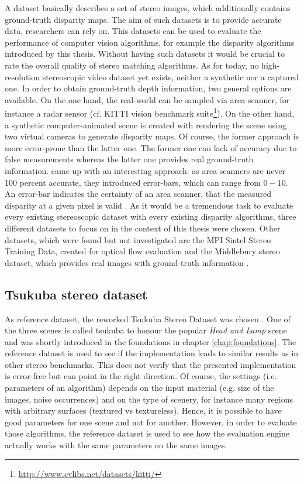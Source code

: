 A dataset basically describes a set of stereo images, which additionally contains ground-truth disparity maps.
The aim of such datasets is to provide accurate data, researchers can rely on.
This datasets can be used to evaluate the performance of computer vision algorithms, for example the disparity algorithms introduced by this thesis.
Without having such datasets it would be crucial to rate the overall quality of stereo matching algorithms.
As for today, no high-resolution stereoscopic video dataset yet exists, neither a synthetic nor a captured one.
In order to obtain ground-truth depth information, two general options are available.
On the one hand, the real-world can be sampled via area scanner, for instance a radar sensor (cf. KITTI vision benchmark suite\footnote{\url{http://www.cvlibs.net/datasets/kitti/}}).
On the other hand, a synthetic computer-animated scene is created with rendering the scene using two virtual cameras to generate disparity maps.
Of course, the former approach is more error-prone than the latter one.
The former one can lack of accuracy due to false measurements whereas the latter one provides real ground-truth information.
\newline\newline\noindent \citeauthor{kondermann2015stereo} came up with an interesting approach:
as area scanners are never 100 percent accurate, they introduced error-bars, which can range from $0-10$.
An error-bar indicates the certainty of an area scanner, that the measured disparity at a given pixel is valid \citep{kondermann2015stereo}.
As it would be a tremendous task to evaluate every existing stereoscopic dataset with every existing disparity algorithms, three different datasets to focus on in the context of this thesis were chosen.
Other datasets, which were found but not investigated are the MPI Sintel Stereo Training Data, created for optical flow evaluation \citep{Butler:ECCV:2012} and the Middlebury stereo dataset, which provides real images with ground-truth information \citep{scharstein2006middlebury}.

\subsection*{Tsukuba stereo dataset}

As reference dataset, the reworked Tsukuba Stereo Dataset was chosen \citep{martull2012realistic}.
One of the three scenes is called tsukuba to honour the popular \textit{Head and Lamp} scene and was shortly introduced in the foundations in chapter \ref{chap:foundations}.
The reference dataset is used to see if the implementation leads to similar results as in other stereo benchmarks.
This does not verify that the presented implementation is error-free but can point in the right direction.
Of course, the settings (i.e. parameters of an algorithm) depends on the input material (e.g. size of the images, noise occurrences) and on the type of scenery, for instance many regions with arbitrary surfaces (textured vs textureless).
Hence, it is possible to have good parameters for one scene and not for another.
However, in order to evaluate those algorithms, the reference dataset is used to see how the evaluation engine actually works with the same parameters on the same images.

